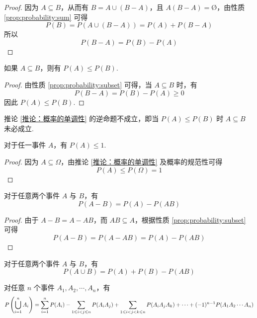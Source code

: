 \begin{proof}
    因为 $A \subseteq B$，从而有 $B = A \cup (B-A)$，且 $A(B-A)=\text{\O}$，由性质 \ref{prop:probability:sum} 可得
    $$
    P(B) = P(A \cup (B-A)) = P(A) + P(B-A)
    $$
    所以
    $$
    P(B-A)=P(B)-P(A)
    $$
\end{proof}

\begin{corollary}[][概率的单调性][推论：概率的单调性]
    \indent 如果 $A \subseteq B$，则有 $P(A) \leqslant P(B)$.
\end{corollary}

\begin{proof}
    由性质 \ref{prop:probability:subset} 可得，当 $A \subseteq B$ 时，有
    $$
    P(B-A) = P(B)-P(A) \geqslant 0
    $$
    因此 $P(A) \leqslant P(B)$.
\end{proof}

\begin{note}
    \indent 推论 \ref{推论：概率的单调性} 的逆命题不成立，即当 $P(A) \leqslant P(B)$ 时 $A \subseteq B$ 未必成立.
\end{note}

\begin{property}[][][prop:probability:<=1]
    \indent 对于任一事件 $A$，有 $P(A) \leqslant 1$.
\end{property}

\begin{proof}
    因为 $A \subseteq \varOmega$，由推论 \ref{推论：概率的单调性} 及概率的规范性可得
    \[
    P(A) \leqslant P(\varOmega) = 1
    \]
\end{proof}

\begin{property}
    \indent 对于任意两个事件 $A$ 与 $B$，有
    \begin{equation}
        P(A-B)=P(A)-P(AB)
    \end{equation}
\end{property}

\begin{proof}
    由于 $A-B=A-AB$，而 $AB \subseteq A$，根据性质 \ref{prop:probability:subset} 可得
    \[
    P(A-B)=P(A-AB)=P(A)-P(AB)
    \]
\end{proof}

\begin{property}
    \indent 对于任意两个事件 $A$ 与 $B$，有
    \begin{equation} \label{equation:add}
        P(A \cup B) = P(A) + P(B) - P(AB)
    \end{equation}

    对任意 $n$ 个事件 $A_1,A_2,\cdots,A_n$，有
    \begin{equation} \label{equation:normal add}
        \small P \left( \bigcup_{i=1}^n A_i \right) = \sum_{i=1}^n P(A_i) - \sum_{1 \leqslant i<j \leqslant n} P(A_i A_j) + \sum_{1 \leqslant i<j<k \leqslant n} P(A_i A_j A_k) + \cdots + (-1)^{n-1} P(A_1 A_2 \cdots A_n)
    \end{equation}
\end{property}

